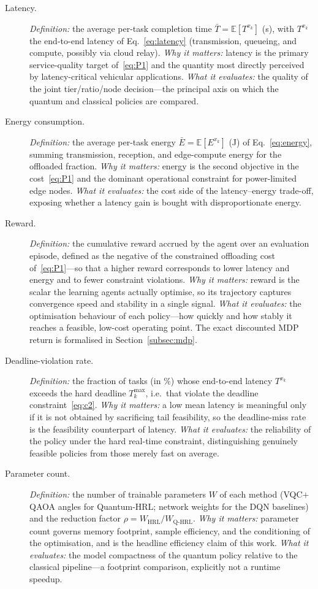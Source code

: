 \documentclass[11pt,a4paper]{article}
\theoremstyle{definition}
\begin{document}
\begin{description}
  \item[Latency.] \emph{Definition:} the average per-task completion time $\bar T=\mathbb{E}[T^{x_k}]$ (s), with $T^{x_k}$ the end-to-end latency of Eq.~\eqref{eq:latency} (transmission, queueing, and compute, possibly via cloud relay). \emph{Why it matters:} latency is the primary service-quality target of~\eqref{eq:P1} and the quantity most directly perceived by latency-critical vehicular applications. \emph{What it evaluates:} the quality of the joint tier/ratio/node decision---the principal axis on which the quantum and classical policies are compared.
  \item[Energy consumption.] \emph{Definition:} the average per-task energy $\bar E=\mathbb{E}[E^{x_k}]$ (J) of Eq.~\eqref{eq:energy}, summing transmission, reception, and edge-compute energy for the offloaded fraction. \emph{Why it matters:} energy is the second objective in the cost~\eqref{eq:P1} and the dominant operational constraint for power-limited edge nodes. \emph{What it evaluates:} the cost side of the latency--energy trade-off, exposing whether a latency gain is bought with disproportionate energy.
  \item[Reward.] \emph{Definition:} the cumulative reward accrued by the agent over an evaluation episode, defined as the negative of the constrained offloading cost of~\eqref{eq:P1}---so that a higher reward corresponds to lower latency and energy and to fewer constraint violations. \emph{Why it matters:} reward is the scalar the learning agents actually optimise, so its trajectory captures convergence speed and stability in a single signal. \emph{What it evaluates:} the optimisation behaviour of each policy---how quickly and how stably it reaches a feasible, low-cost operating point. The exact discounted MDP return is formalised in Section~\ref{subsec:mdp}.
  \item[Deadline-violation rate.] \emph{Definition:} the fraction of tasks (in $\%$) whose end-to-end latency $T^{x_k}$ exceeds the hard deadline $T_k^{\max}$, i.e.\ that violate the deadline constraint~\eqref{eq:c2}. \emph{Why it matters:} a low mean latency is meaningful only if it is not obtained by sacrificing tail feasibility, so the deadline-miss rate is the feasibility counterpart of latency. \emph{What it evaluates:} the reliability of the policy under the hard real-time constraint, distinguishing genuinely feasible policies from those merely fast on average.
  \item[Parameter count.] \emph{Definition:} the number of trainable parameters $W$ of each method (VQC$+$QAOA angles for Quantum-HRL; network weights for the DQN baselines) and the reduction factor $\rho=W_{\mathrm{HRL}}/W_{\mathrm{Q\text{-}HRL}}$. \emph{Why it matters:} parameter count governs memory footprint, sample efficiency, and the conditioning of the optimisation, and is the headline efficiency claim of this work. \emph{What it evaluates:} the model compactness of the quantum policy relative to the classical pipeline---a footprint comparison, explicitly not a runtime speedup.
\end{description}
\end{document}
